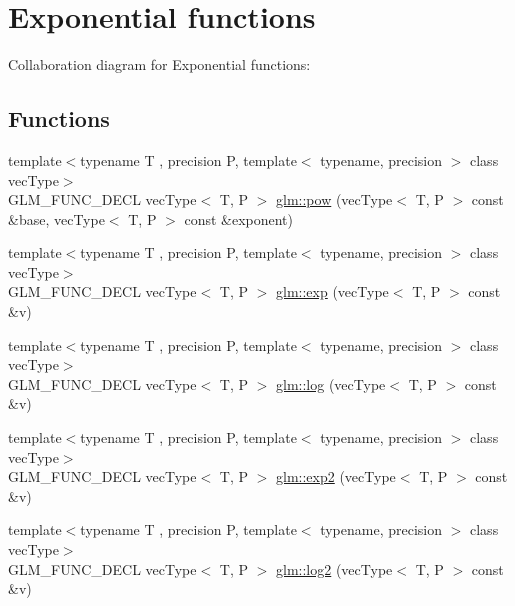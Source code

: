 \hypertarget{group__core__func__exponential}{\section{Exponential functions}
\label{group__core__func__exponential}
}
Collaboration diagram for Exponential functions\-:
\subsection*{Functions}
\begin{DoxyCompactItemize}
\item 
{\footnotesize template$<$typename T , precision P, template$<$ typename, precision $>$ class vec\-Type$>$ }\\G\-L\-M\-\_\-\-F\-U\-N\-C\-\_\-\-D\-E\-C\-L vec\-Type$<$ T, P $>$ \hyperlink{group__core__func__exponential_ga082b332a4b7c6ad1d43e09ff19e214dd}{glm\-::pow} (vec\-Type$<$ T, P $>$ const \&base, vec\-Type$<$ T, P $>$ const \&exponent)
\item 
{\footnotesize template$<$typename T , precision P, template$<$ typename, precision $>$ class vec\-Type$>$ }\\G\-L\-M\-\_\-\-F\-U\-N\-C\-\_\-\-D\-E\-C\-L vec\-Type$<$ T, P $>$ \hyperlink{group__core__func__exponential_ga25e54a7f44fc49ec6ac6ffc7675cf04a}{glm\-::exp} (vec\-Type$<$ T, P $>$ const \&v)
\item 
{\footnotesize template$<$typename T , precision P, template$<$ typename, precision $>$ class vec\-Type$>$ }\\G\-L\-M\-\_\-\-F\-U\-N\-C\-\_\-\-D\-E\-C\-L vec\-Type$<$ T, P $>$ \hyperlink{group__core__func__exponential_ga21efca311e62d233de0ae96bab126b83}{glm\-::log} (vec\-Type$<$ T, P $>$ const \&v)
\item 
{\footnotesize template$<$typename T , precision P, template$<$ typename, precision $>$ class vec\-Type$>$ }\\G\-L\-M\-\_\-\-F\-U\-N\-C\-\_\-\-D\-E\-C\-L vec\-Type$<$ T, P $>$ \hyperlink{group__core__func__exponential_ga42ca440d9062f1f456f5a9e896378f9c}{glm\-::exp2} (vec\-Type$<$ T, P $>$ const \&v)
\item 
{\footnotesize template$<$typename T , precision P, template$<$ typename, precision $>$ class vec\-Type$>$ }\\G\-L\-M\-\_\-\-F\-U\-N\-C\-\_\-\-D\-E\-C\-L vec\-Type$<$ T, P $>$ \hyperlink{group__core__func__exponential_gabae30945338a555a03733f00dad95d0d}{glm\-::log2} (vec\-Type$<$ T, P $>$ const \&v)

\end{DoxyCompactItemize}
